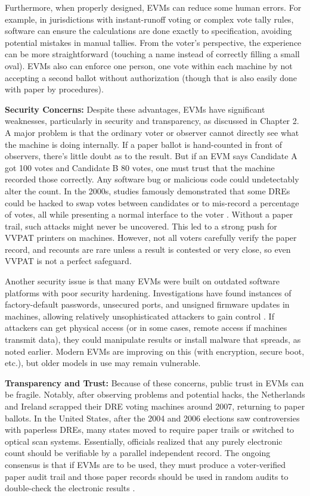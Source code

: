 \documentclass[a4paper,10pt]{report}
\begin{document}
Furthermore, when properly designed, EVMs can reduce some human errors. For example, in jurisdictions with instant-runoff voting or complex vote tally rules, software can ensure the calculations are done exactly to specification, avoiding potential mistakes in manual tallies. From the voter’s perspective, the experience can be more straightforward (touching a name instead of correctly filling a small oval). EVMs also can enforce one person, one vote within each machine by not accepting a second ballot without authorization (though that is also easily done with paper by procedures).

\textbf {Security Concerns:} Despite these advantages, EVMs have significant weaknesses, particularly in security and transparency, as discussed in Chapter 2. A major problem is that the ordinary voter or observer cannot directly see what the machine is doing internally. If a paper ballot is hand-counted in front of observers, there’s little doubt as to the result. But if an EVM says Candidate A got 100 votes and Candidate B 80 votes, one must trust that the machine recorded those correctly. Any software bug or malicious code could undetectably alter the count. In the 2000s, studies famously demonstrated that some DREs could be hacked to swap votes between candidates or to mis-record a percentage of votes, all while presenting a normal interface to the voter \cite{uconnEVM}. Without a paper trail, such attacks might never be uncovered. This led to a strong push for VVPAT printers on machines. However, not all voters carefully verify the paper record, and recounts are rare unless a result is contested or very close, so even VVPAT is not a perfect safeguard.

Another security issue is that many EVMs were built on outdated software platforms with poor security hardening. Investigations have found instances of factory-default passwords, unsecured ports, and unsigned firmware updates in machines, allowing relatively unsophisticated attackers to gain control \cite{uconnEVM}. If attackers can get physical access (or in some cases, remote access if machines transmit data), they could manipulate results or install malware that spreads, as noted earlier. Modern EVMs are improving on this (with encryption, secure boot, etc.), but older models in use may remain vulnerable.

\textbf {Transparency and Trust:} Because of these concerns, public trust in EVMs can be fragile. Notably, after observing problems and potential hacks, the Netherlands and Ireland scrapped their DRE voting machines around 2007, returning to paper ballots. In the United States, after the 2004 and 2006 elections saw controversies with paperless DREs, many states moved to require paper trails or switched to optical scan systems. Essentially, officials realized that any purely electronic count should be verifiable by a parallel independent record. The ongoing consensus is that if EVMs are to be used, they must produce a voter-verified paper audit trail and those paper records should be used in random audits to double-check the electronic results \cite{brookingsEVM}.
\end{document}

